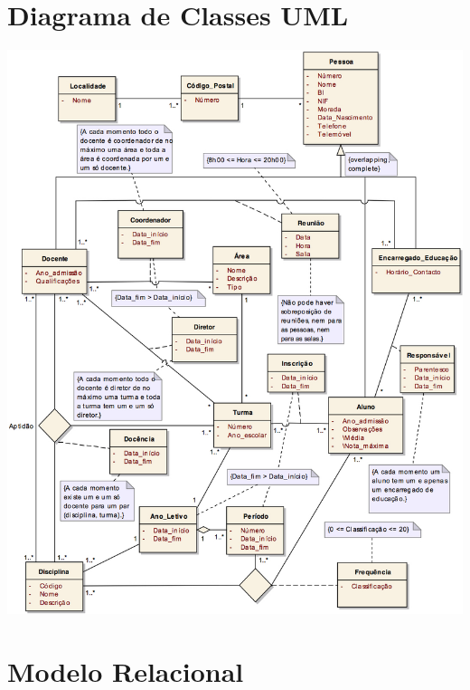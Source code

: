 \documentclass[12pt,a4paper,reqno]{report}
\numberwithin{figure}{section}
\numberwithin{equation}{section}
\begin{document}
\chapter{Diagrama de Classes UML}

\begin{center}

\includegraphics[width=16cm]{UML2.jpg}

\end{center}

\chapter{Modelo Relacional}
\end{document}

